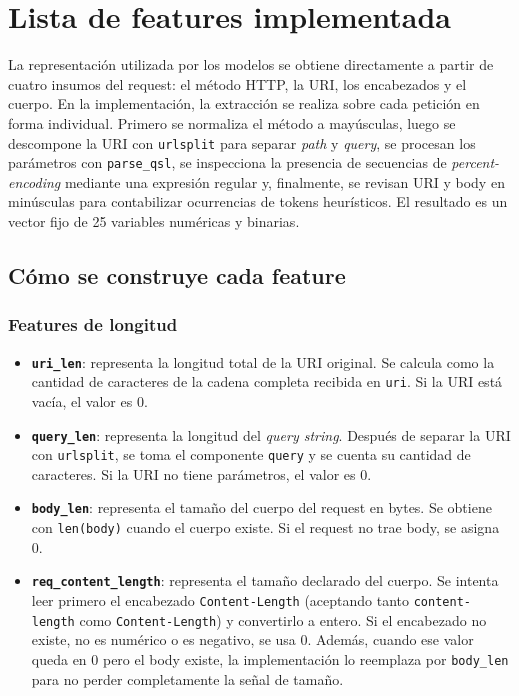 \documentclass[12pt,oneside]{report}
\begin{document}
\section{Lista de features implementada}
La representación utilizada por los modelos se obtiene directamente a partir de cuatro insumos del request: el método HTTP, la URI, los encabezados y el cuerpo. En la implementación, la extracción se realiza sobre cada petición en forma individual. Primero se normaliza el método a mayúsculas, luego se descompone la URI con \texttt{urlsplit} para separar \textit{path} y \textit{query}, se procesan los parámetros con \texttt{parse\_qsl}, se inspecciona la presencia de secuencias de \textit{percent-encoding} mediante una expresión regular y, finalmente, se revisan URI y body en minúsculas para contabilizar ocurrencias de tokens heurísticos. El resultado es un vector fijo de 25 variables numéricas y binarias.

\subsection{Cómo se construye cada feature}

\subsubsection{Features de longitud}
\begin{itemize}[leftmargin=*]
  \item \textbf{\texttt{uri\_len}}: representa la longitud total de la URI original. Se calcula como la cantidad de caracteres de la cadena completa recibida en \texttt{uri}. Si la URI está vacía, el valor es 0.

  \item \textbf{\texttt{query\_len}}: representa la longitud del \textit{query string}. Después de separar la URI con \texttt{urlsplit}, se toma el componente \texttt{query} y se cuenta su cantidad de caracteres. Si la URI no tiene parámetros, el valor es 0.

  \item \textbf{\texttt{body\_len}}: representa el tamaño del cuerpo del request en bytes. Se obtiene con \texttt{len(body)} cuando el cuerpo existe. Si el request no trae body, se asigna 0.

  \item \textbf{\texttt{req\_content\_length}}: representa el tamaño declarado del cuerpo. Se intenta leer primero el encabezado \texttt{Content-Length} (aceptando tanto \texttt{content-length} como \texttt{Content-Length}) y convertirlo a entero. Si el encabezado no existe, no es numérico o es negativo, se usa 0. Además, cuando ese valor queda en 0 pero el body existe, la implementación lo reemplaza por \texttt{body\_len} para no perder completamente la señal de tamaño.
\end{itemize}
\end{document}
